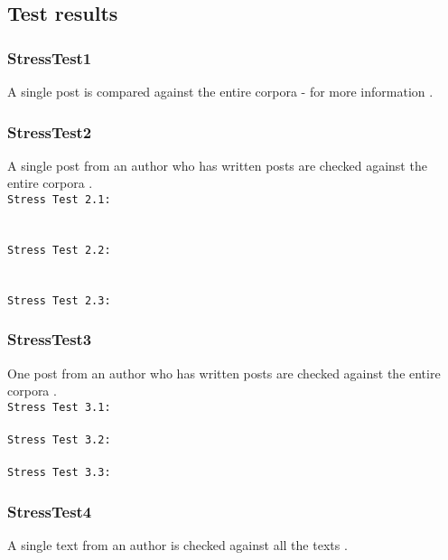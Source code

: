 \subsection{Test results}

\subsubsection{StressTest1}
A single post is compared against the entire corpora - for more information .\\


\subsubsection{StressTest2}
A single post from an author who has written  posts are checked against the entire corpora .\\

\texttt{Stress Test 2.1:}\\
\\ \\

\texttt{Stress Test 2.2:}\\
\\ \\

\texttt{Stress Test 2.3:}\\


\subsubsection{StressTest3}
One post from an author who has written  posts are checked against the entire corpora .\\

\texttt{Stress Test 3.1:}\\
\\

\texttt{Stress Test 3.2:}\\
\\

\texttt{Stress Test 3.3:}\\


\subsubsection{StressTest4}
A single text from an author is checked against all the texts  .\\

